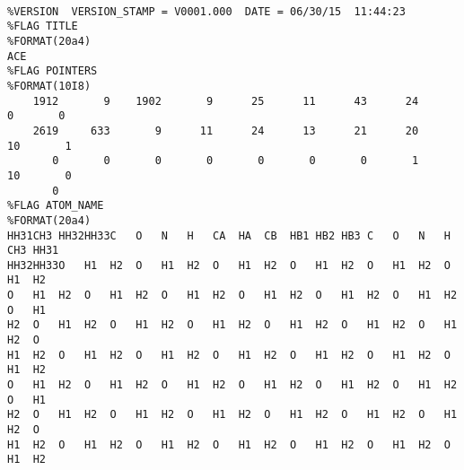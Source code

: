 \documentclass[9pt,tutorial]{livecoms}
\begin{document}
{\scriptsize
\begin{lstlisting}[columns=flexible]

%VERSION  VERSION_STAMP = V0001.000  DATE = 06/30/15  11:44:23                  
%FLAG TITLE                                                                     
%FORMAT(20a4)                                                                   
ACE                                                                             
%FLAG POINTERS                                                                  
%FORMAT(10I8)                                                                   
    1912       9    1902       9      25      11      43      24       0       0
    2619     633       9      11      24      13      21      20      10       1
       0       0       0       0       0       0       0       1      10       0
       0
%FLAG ATOM_NAME                                                                 
%FORMAT(20a4)                                                                   
HH31CH3 HH32HH33C   O   N   H   CA  HA  CB  HB1 HB2 HB3 C   O   N   H   CH3 HH31
HH32HH33O   H1  H2  O   H1  H2  O   H1  H2  O   H1  H2  O   H1  H2  O   H1  H2  
O   H1  H2  O   H1  H2  O   H1  H2  O   H1  H2  O   H1  H2  O   H1  H2  O   H1  
H2  O   H1  H2  O   H1  H2  O   H1  H2  O   H1  H2  O   H1  H2  O   H1  H2  O   
H1  H2  O   H1  H2  O   H1  H2  O   H1  H2  O   H1  H2  O   H1  H2  O   H1  H2  
O   H1  H2  O   H1  H2  O   H1  H2  O   H1  H2  O   H1  H2  O   H1  H2  O   H1  
H2  O   H1  H2  O   H1  H2  O   H1  H2  O   H1  H2  O   H1  H2  O   H1  H2  O   
H1  H2  O   H1  H2  O   H1  H2  O   H1  H2  O   H1  H2  O   H1  H2  O   H1  H2 
\end{lstlisting}
}
\end{document}
